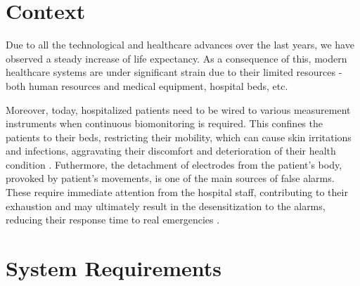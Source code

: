 

\section{Context}

Due to all the technological and healthcare advances over the last years, we have observed a steady increase of life expectancy. As a consequence of this, modern healthcare systems are under significant strain due to their limited resources - both human resources and medical equipment, hospital beds, etc.


Moreover, today, hospitalized patients need to be wired to various measurement instruments when continuous biomonitoring is required. This confines the patients to their beds, restricting their mobility, which can cause skin irritations and infections, aggravating their discomfort and deterioration of their health condition \cite{Darwish2011}. Futhermore, the detachment of electrodes from the patient's body, provoked by patient's movements, is one of the main sources of false alarms. These require immediate attention from the hospital staff, contributing to their exhaustion and may ultimately result in the desensitization to the alarms, reducing their response time to real emergencies \cite{DursunErgezen2020}.



\section{System Requirements}

